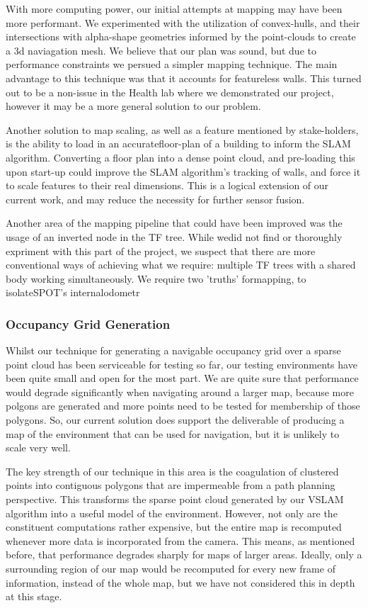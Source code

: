 \documentclass[10pt,english]{article}
\begin{document}
With more computing power, our initial attempts at mapping may have been more performant. We experimented with the utilization of convex-hulls, and their intersections with alpha-shape geometries informed by the point-clouds to create a 3d naviagation mesh. We believe that our plan was sound, but due to performance constraints we persued a simpler mapping technique. The main advantage to this technique was that it accounts for featureless walls. This turned out to be a non-issue in the Health lab where we demonstrated our project, however it may be a more general solution to our problem.

Another solution to map scaling, as well as a feature mentioned by stake-holders, is the ability to load in an accuratefloor-plan of a building to inform the SLAM algorithm. Converting a floor plan into a dense point cloud, and pre-loading this upon start-up could improve the SLAM algorithm's tracking of walls, and force it to scale features to their real dimensions. This is a logical extension of our current work, and may reduce the necessity for further sensor fusion.

Another area of the mapping pipeline that could have been improved was the usage of an inverted node in the TF tree. While wedid not find or thoroughly expriment with this part of the project, we suspect that there are more conventional ways of achieving what we require: multiple TF trees with a shared body working simultaneously. We require two 'truths' formapping, to isolateSPOT's internalodometr

\subsubsection*{Occupancy Grid Generation}

Whilst our technique for generating a navigable occupancy grid over a sparse point cloud has been serviceable for testing so far, our testing environments have been quite small and open for the most part. We are quite sure that performance would degrade significantly when navigating around a larger map, because more polgons are generated and more points need to be tested for membership of those polygons. So, our current solution does support the deliverable of producing a map of the environment that can be used for navigation, but it is unlikely to scale very well.

The key strength of our technique in this area is the coagulation of clustered points into contiguous polygons that are impermeable from a path planning perspective. This transforms the sparse point cloud generated by our VSLAM algorithm into a useful model of the environment. However, not only are the constituent computations rather expensive, but the entire map is recomputed whenever more data is incorporated from the camera. This means, as mentioned before, that performance degrades sharply for maps of larger areas. Ideally, only a surrounding region of our map would be recomputed for every new frame of information, instead of the whole map, but we have not considered this in depth at this stage.
\end{document}
